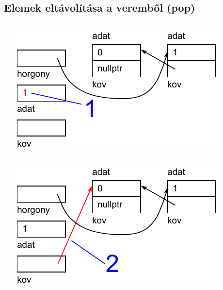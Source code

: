 \subsection{Elemek eltávolítása a veremből (pop)}
\begin{frame}
  \begin{columns}[c]
      \footnotesize
      \begin{exampleblock}{}
        
      \end{exampleblock}
      \includegraphics[width=\textwidth]{verem/verem10.pdf}
  \end{columns}
\end{frame}

\begin{frame}
  \begin{columns}[c]
      \footnotesize
      \begin{exampleblock}{}
        
      \end{exampleblock}
      \includegraphics[width=\textwidth]{verem/verem11.pdf}
  \end{columns}
\end{frame}

